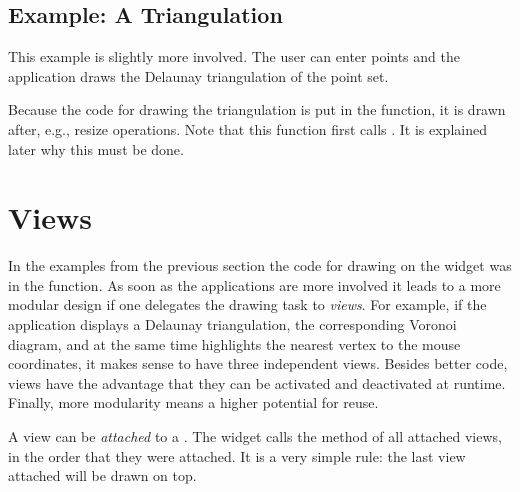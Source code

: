 

\subsection{Example: A Triangulation}

This example is slightly more involved. The user can enter points and the application
draws the Delaunay triangulation of the point set. 


Because the code for drawing the triangulation is put in the
 function, it is drawn after, e.g., resize
operations. Note that this function first calls
. It is explained later why this must be
done.

\section{Views}
\label{Qt_widget_views}

In the examples from the previous section the code for drawing on the
widget was in the  function. As soon as the applications are more 
involved it leads to a more modular design if one delegates the drawing task to {\em views}. 
For example, if the application displays a Delaunay triangulation, the corresponding Voronoi diagram,
 and at the same time highlights the nearest vertex to the mouse coordinates, it makes
sense to have three independent views. Besides better code, views have the advantage that they
can be activated and deactivated at runtime. Finally, more modularity means a higher potential
for reuse.

A view can be {\em attached} to a . The widget calls
the method  of all attached views, in the
order that they were attached. It is a very simple rule: the last view
attached will be drawn on top.

